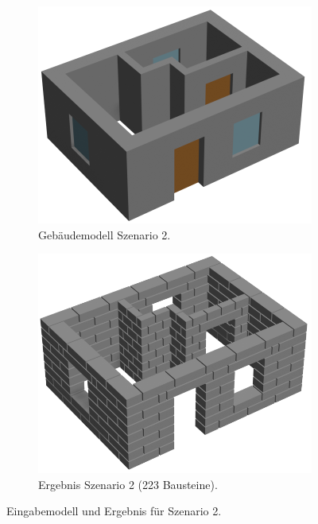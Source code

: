\begin{figure}[htb]
  \begin{subfigure}[b]{0.49\columnwidth}
    \includegraphics[width=\columnwidth]{fig/scenario2_rendering_input.png}
    \caption{Gebäudemodell Szenario 2.}\label{fig:poc:scenario2 modell}
  \end{subfigure}
  \hfill
  \begin{subfigure}[b]{0.49\columnwidth}
    \includegraphics[width=\columnwidth]{fig/scenario2_render.png}
    \caption{Ergebnis Szenario 2 (223 Bausteine).}\label{fig:poc:scenario2_ergebnis}
  \end{subfigure}
\caption{Eingabemodell und Ergebnis für Szenario 2.}\label{fig:poc:result_scenario2}
\end{figure}

